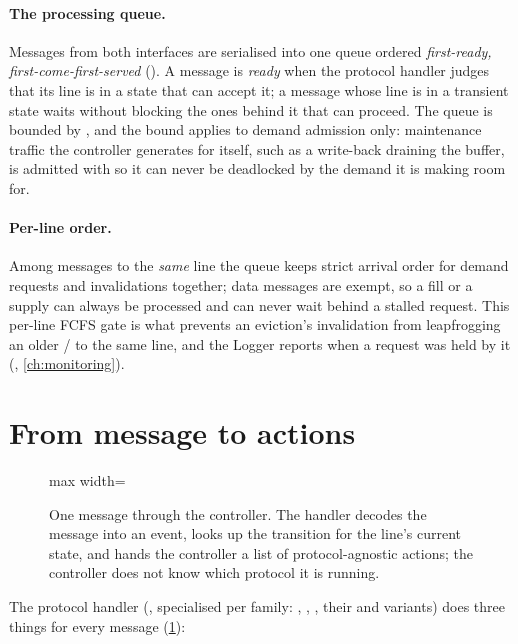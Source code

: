 \paragraph{The processing queue.} Messages from both interfaces are serialised into one
queue ordered \emph{first-ready, first-come-first-served} (). A message
is \emph{ready} when the protocol handler judges that its line is in a state that can accept
it; a message whose line is in a transient state waits without blocking the ones behind it
that can proceed. The queue is bounded by , and the bound applies
to demand admission only: maintenance traffic the controller generates for itself, such as a
write-back draining the buffer, is admitted with  so it can never be
deadlocked by the demand it is making room for.

\paragraph{Per-line order.} Among messages to the \emph{same} line the queue keeps strict
arrival order for demand requests and invalidations together; data messages are exempt, so a
fill or a supply can always be processed and can never wait behind a stalled request. This
per-line FCFS gate is what prevents an eviction's invalidation from leapfrogging an older
/ to the same line, and the Logger reports when a request was held by it
(, \cref{ch:monitoring}).

\section{From message to actions}

\begin{figure}[htbp]\centering
\begin{adjustbox}{max width=\textwidth}\end{adjustbox}
\caption{One message through the controller. The handler decodes the message into an event,
looks up the transition for the line's current state, and hands the controller a list of
protocol-agnostic actions; the controller does not know which protocol it is running.}
\label{fig:controller-sequence}
\end{figure}

The protocol handler (, specialised per family:
, , , their  and
 variants) does three things for every message
(\cref{fig:controller-sequence}):

